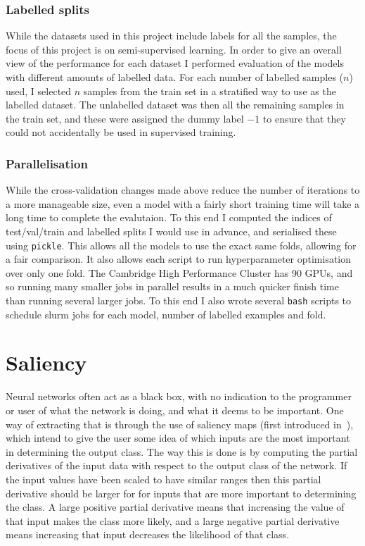 \documentclass[12pt,a4paper,twoside,openright]{report}
\begin{document}
\subsubsection{Labelled splits}
While the datasets used in this project include labels for all the samples, the focus of this project is on semi-supervised learning.
In order to give an overall view of the performance for each dataset I performed evaluation of the models with different amounts of
labelled data. For each number of labelled samples ($n$) used, I selected $n$ samples from the train set in a stratified way to use as the 
labelled dataset. The unlabelled dataset was then all the remaining samples in the train set, and these were assigned the dummy label $-1$ to 
ensure that they could not accidentally be used in supervised training.

\subsubsection{Parallelisation}
While the cross-validation changes made above reduce the number of iterations to a more manageable size, even a model with a fairly short 
training time will take a long time to complete the evalutaion. To this end I computed the indices of test/val/train and labelled 
splits I would use in advance, and serialised these using \texttt{pickle}. This allows all the models to use the exact same folds, allowing
for a fair comparison. It also allows each script to run hyperparameter optimisation over only one fold. The Cambridge High Performance
Cluster has 90 GPUs, and so running many smaller jobs in parallel results in a much quicker finish time than running several larger jobs.
To this end I also wrote several \texttt{bash} scripts to schedule slurm jobs for each model, number of labelled examples and fold. 

\section{Saliency}
Neural networks often act as a black box, with no indication to the programmer or user of what the network is doing, and what it deems 
to be important. One way of extracting that is through the use of saliency maps (first introduced in~\cite{DBLP:journals/corr/SimonyanVZ13}), 
which intend to give the user some idea of which inputs 
are the most important in determining the output class. The way this is done is by computing the partial derivatives of the input data 
with respect to the output class of the network. If the input values have been scaled to have similar ranges then this partial derivative
should be larger for for inputs that are more important to determining the class. A large positive partial derivative means that increasing 
the value of that input makes the class more likely, and a large negative partial derivative means increasing that input decreases the 
likelihood of that class.
\end{document}
